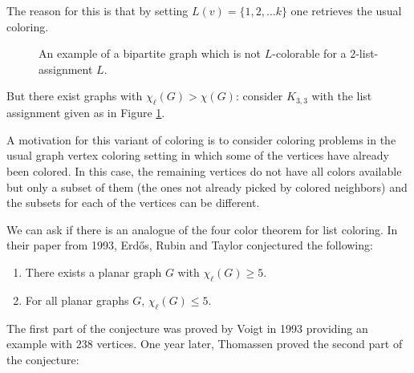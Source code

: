 The reason for this is that by setting $L(v) = \{1, 2, \ldots k\}$ one retrieves the usual coloring.

\begin{figure}
\label{fig:k33not2lcolorable}
\centering
\begin{center}
\end{center}
\caption{An example of a bipartite graph which is not $L$-colorable for a $2$-list-assignment $L$.}
\end{figure}

But there exist graphs with $\chi_{\ell}(G) > \chi(G)$: consider $K_{3, 3}$ with the list
assignment given as in Figure \ref{fig:k33not2lcolorable}.

A motivation for this variant of coloring is to consider coloring problems in the usual graph vertex
coloring setting in which some of the vertices have already been colored. In this case, the 
remaining vertices do not have all colors available but only a subset of them (the ones not already
picked by colored neighbors) and the subsets for each of the vertices can be different. 

We can ask if there is an analogue of the four color theorem for list coloring.
In their paper from 1993, Erdős, Rubin and Taylor conjectured the following:

\begin{conjecture}
\begin{enumerate}
	\item There exists a planar graph $G$ with $\chi_{\ell}(G) \geq 5$. 
	\item For all planar graphs $G$, $\chi_{\ell}(G) \leq 5$.
\end{enumerate}
\end{conjecture}

The first part of the conjecture was proved by Voigt \cite{voigt1993} in 1993 providing an 
example with $238$ vertices. One year later, Thomassen proved the second part of the conjecture:

